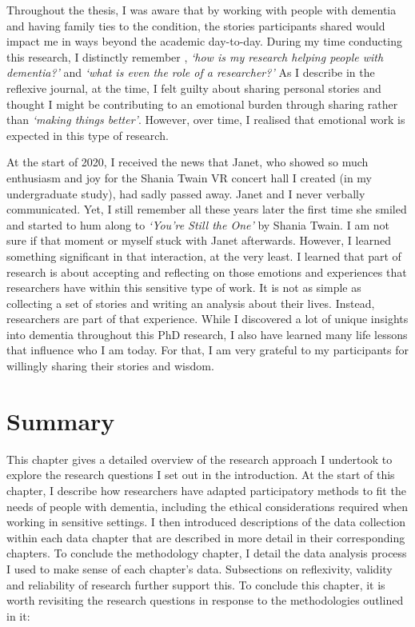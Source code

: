 Throughout the thesis, I was aware that by working with people with dementia and having family ties to the condition, the stories participants shared would impact me in ways beyond the academic day-to-day. During my time conducting this research, I distinctly remember , \textit{`how is my research helping people with dementia?'} and \textit{`what is even the role of a researcher?'} As I describe in the reflexive journal, at the time, I felt guilty about sharing personal stories and thought I might be contributing to an emotional burden through sharing rather than \textit{`making things better'}. However, over time, I realised that emotional work is expected in this type of research.

At the start of 2020, I received the news that Janet, who showed so much enthusiasm and joy for the Shania Twain VR concert hall I created (in my undergraduate study), had sadly passed away. Janet and I never verbally communicated. Yet, I still remember all these years later the first time she smiled and started to hum along to \textit{`You're Still the One'} by Shania Twain. I am not sure if that moment or myself stuck with Janet afterwards. However, I learned something significant in that interaction, at the very least. I learned that part of research is about accepting and reflecting on those emotions and experiences that researchers have within this sensitive type of work. It is not as simple as collecting a set of stories and writing an analysis about their lives. Instead, researchers are part of that experience. While I discovered a lot of unique insights into dementia throughout this PhD research, I also have learned many life lessons that influence who I am today. For that, I am very grateful to my participants for willingly sharing their stories and wisdom.

\section{Summary}
\label{Method:summary}
This chapter gives a detailed overview of the research approach I undertook to explore the research questions I set out in the introduction. At the start of this chapter, I describe how researchers have adapted participatory methods to fit the needs of people with dementia, including the ethical considerations required when working in sensitive settings. I then introduced descriptions of the data collection within each data chapter that are described in more detail in their corresponding chapters. To conclude the methodology chapter, I detail the data analysis process I used to make sense of each chapter's data. Subsections on reflexivity, validity and reliability of research further support this. To conclude this chapter, it is worth revisiting the research questions in response to the methodologies outlined in it:

